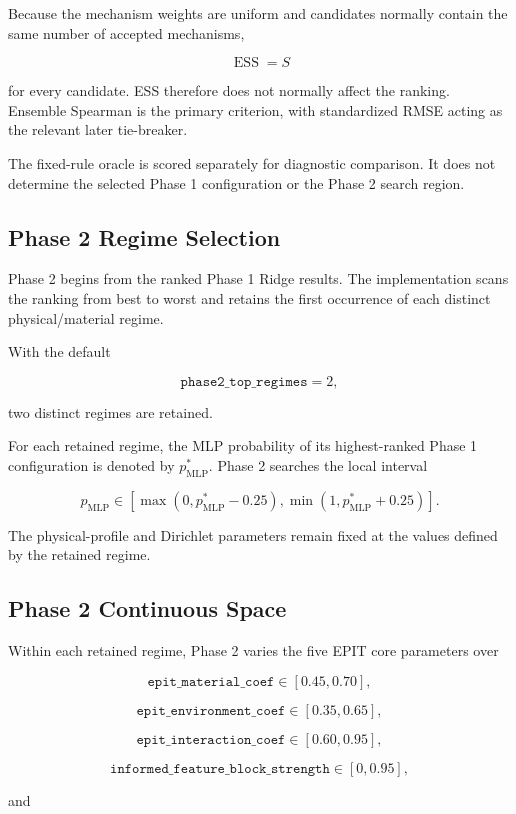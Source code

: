 \documentclass{article}
\begin{document}
Because the mechanism weights are uniform and candidates normally contain the same number of accepted mechanisms,

\[
\operatorname{ESS}=S
\]

for every candidate. ESS therefore does not normally affect the ranking. Ensemble Spearman is the primary criterion, with standardized RMSE acting as the relevant later tie-breaker.

The fixed-rule oracle is scored separately for diagnostic comparison. It does not determine the selected Phase 1 configuration or the Phase 2 search region.

\subsection{Phase 2 Regime Selection}

Phase 2 begins from the ranked Phase 1 Ridge results. The implementation scans the ranking from best to worst and retains the first occurrence of each distinct physical/material regime.

With the default

\[
\texttt{phase2\_top\_regimes}=2,
\]

two distinct regimes are retained.

For each retained regime, the MLP probability of its highest-ranked Phase 1 configuration is denoted by \(p_{\mathrm{MLP}}^\ast\). Phase 2 searches the local interval

\[
p_{\mathrm{MLP}}
\in
\left[
\max(0,p_{\mathrm{MLP}}^\ast-0.25),
\min(1,p_{\mathrm{MLP}}^\ast+0.25)
\right].
\]

The physical-profile and Dirichlet parameters remain fixed at the values defined by the retained regime.

\subsection{Phase 2 Continuous Space}

Within each retained regime, Phase 2 varies the five EPIT core parameters over

\[
\texttt{epit\_material\_coef}
\in
[0.45,0.70],
\]

\[
\texttt{epit\_environment\_coef}
\in
[0.35,0.65],
\]

\[
\texttt{epit\_interaction\_coef}
\in
[0.60,0.95],
\]

\[
\texttt{informed\_feature\_block\_strength}
\in
[0,0.95],
\]

and
\end{document}
